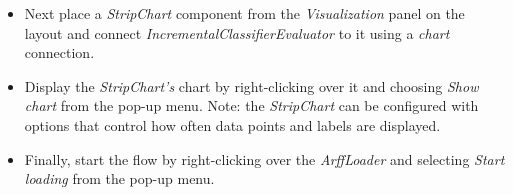 \begin{itemize}
        \item Next place a \textit{StripChart} component from the \textit{Visualization}
        panel on the layout and connect \textit{IncrementalClassifierEvaluator} to it
        using a \textit{chart} connection.

        \item Display the \textit{StripChart's} chart by right-clicking over it and choosing
        \textit{Show chart} from the pop-up menu. Note: the \textit{StripChart} can be configured
        with options that control how often data points and labels are displayed.

        \item Finally, start the flow by right-clicking over the \textit{ArffLoader} and
        selecting \textit{Start loading} from the pop-up menu.        
\end{itemize}

